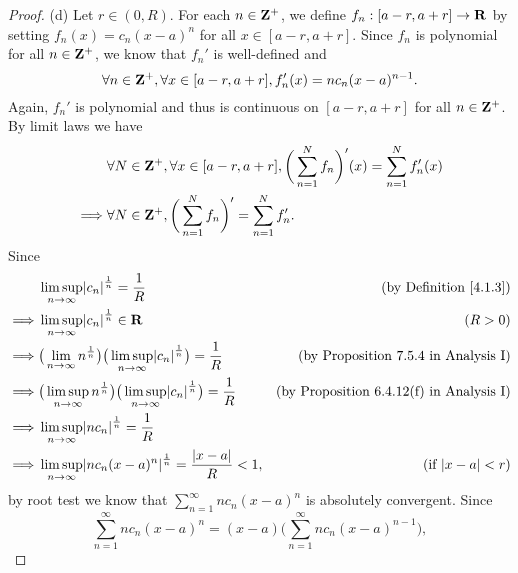 \begin{proof}{(d)}
    Let \(r \in (0, R)\).
    For each \(n \in \mathbf{Z}^+\), we define \(f_n : [a - r, a + r] \to \mathbf{R}\) by setting \(f_n(x) = c_n (x - a)^n\) for all \(x \in [a - r, a + r]\).
    Since \(f_n\) is polynomial for all \(n \in \mathbf{Z}^+\), we know that \(f_n'\) is well-defined and
    \[
        \forall n \in \mathbf{Z}^+, \forall x \in [a - r, a + r], f_n'(x) = n c_n (x - a)^{n - 1}.
    \]
    Again, \(f_n'\) is polynomial and thus is continuous on \([a - r, a + r]\) for all \(n \in \mathbf{Z}^+\).
    By limit laws we have
    \begin{align*}
                 & \forall N \in \mathbf{Z}^+, \forall x \in [a - r, a + r], \bigg(\sum_{n = 1}^N f_n\bigg)'(x) = \sum_{n = 1}^N f_n'(x) \\
        \implies & \forall N \in \mathbf{Z}^+, \bigg(\sum_{n = 1}^N f_n\bigg)' = \sum_{n = 1}^N f_n'.
    \end{align*}
    Since
    \begin{align*}
                 & \limsup_{n \to \infty} \abs{c_n}^{\frac{1}{n}} = \frac{1}{R}                                                            & \text{(by Definition \ref{4.1.3})}              \\
        \implies & \limsup_{n \to \infty} \abs{c_n}^{\frac{1}{n}} \in \R                                                                   & (R > 0)                                         \\
        \implies & \big(\lim_{n \to \infty} n^{\frac{1}{n}}\big) \big(\limsup_{n \to \infty} \abs{c_n}^{\frac{1}{n}}\big) = \frac{1}{R}    & \text{(by Proposition 7.5.4 in Analysis I)}     \\
        \implies & \big(\limsup_{n \to \infty} n^{\frac{1}{n}}\big) \big(\limsup_{n \to \infty} \abs{c_n}^{\frac{1}{n}}\big) = \frac{1}{R} & \text{(by Proposition 6.4.12(f) in Analysis I)} \\
        \implies & \limsup_{n \to \infty} \abs{n c_n}^{\frac{1}{n}} = \frac{1}{R}                                                                                                            \\
        \implies & \limsup_{n \to \infty} \abs{n c_n (x - a)^n}^{\frac{1}{n}} = \frac{\abs{x - a}}{R} < 1,                                 & \text{(if \(\abs{x - a} < r\))}
    \end{align*}
    by root test we know that \(\sum_{n = 1}^\infty n c_n (x - a)^n\) is absolutely convergent.
    Since
    \[
        \sum_{n = 1}^\infty n c_n (x - a)^n = (x - a) \bigg(\sum_{n = 1}^\infty n c_n (x - a)^{n - 1}\bigg),
\]
\end{proof}
